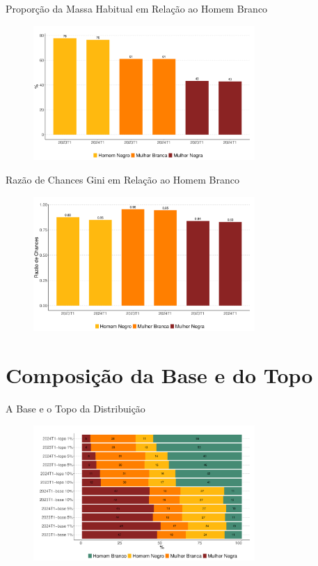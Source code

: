 \documentclass[10pt, xcolor=x11names,compress]{beamer}
\begin{document}
	\begin{frame}{Proporção da Massa Habitual em Relação ao Homem Branco}
		\begin{figure}
			\centering
			\includegraphics[width = 0.75\textwidth]{figures_output/frac_massa_habitual.pdf}
		\end{figure}
	\end{frame}
	
	
	\begin{frame}{Razão de Chances Gini em Relação ao Homem Branco}
		\begin{figure}
			\centering
			\includegraphics[width = 0.75\textwidth]{figures_output/frac_gini.pdf}
		\end{figure}
	\end{frame}
	
	\section{Composição da Base e do Topo}
	\begin{frame}{A Base e o Topo da Distribuição}
		\begin{figure}
			\centering
			\includegraphics[width = 0.75\textwidth]{figures_output/top_bottom.pdf}
		\end{figure}
	\end{frame}
	
\end{document}

